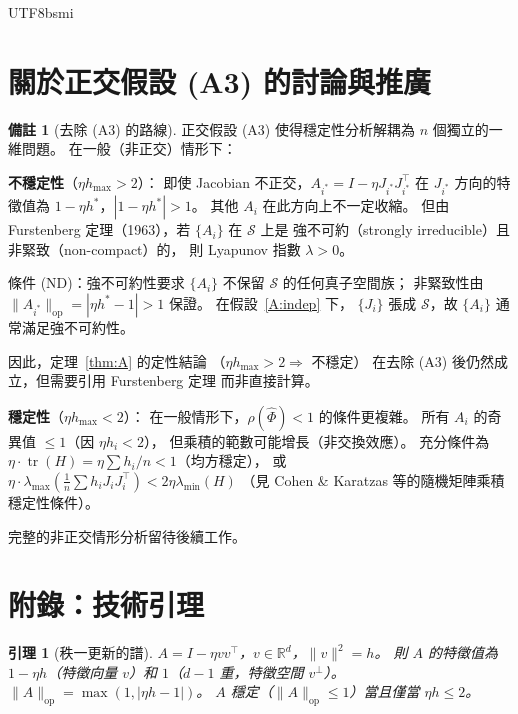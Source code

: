 \documentclass[11pt,a4paper]{article}
\newtheorem{lemma}[theorem]{引理}
\theoremstyle{definition}
\newtheorem{remark}[theorem]{備註}
\DeclareMathOperator{\tr}{tr}
\newcommand{\R}{\mathbb{R}}
\newcommand{\cS}{\mathcal{S}}
\begin{document}
\begin{CJK}{UTF8}{bsmi}
\section{關於正交假設 (A3) 的討論與推廣}

\begin{remark}[去除 (A3) 的路線]
  正交假設 (A3) 使得穩定性分析解耦為 $n$ 個獨立的一維問題。
  在一般（非正交）情形下：

  \textbf{不穩定性}（$\eta h_{\max}>2$）：
  即使 Jacobian 不正交，$A_{i^*}=I-\eta J_{i^*}J_{i^*}^\top$ 在 $J_{i^*}$
  方向的特徵值為 $1-\eta h^*$，$|1-\eta h^*|>1$。
  其他 $A_i$ 在此方向上不一定收縮。
  但由 Furstenberg 定理（1963），若 $\{A_i\}$ 在 $\cS$ 上是
  強不可約（strongly irreducible）且非緊致（non-compact）的，
  則 Lyapunov 指數 $\lambda>0$。

  條件 (ND)：強不可約性要求 $\{A_i\}$ 不保留 $\cS$ 的任何真子空間族；
  非緊致性由 $\|A_{i^*}\|_{\mathrm{op}}=|\eta h^*-1|>1$ 保證。
  在假設~\ref{A:indep} 下，
  $\{J_i\}$ 張成 $\cS$，故 $\{A_i\}$ 通常滿足強不可約性。

  因此，定理~\ref{thm:A} 的定性結論
  （$\eta h_{\max}>2 \Rightarrow$ 不穩定）
  在去除 (A3) 後仍然成立，但需要引用 Furstenberg 定理
  而非直接計算。

  \textbf{穩定性}（$\eta h_{\max}<2$）：
  在一般情形下，$\rho(\hat\Phi)<1$ 的條件更複雜。
  所有 $A_i$ 的奇異值 $\leq 1$（因 $\eta h_i<2$），
  但乘積的範數可能增長（非交換效應）。
  充分條件為 $\eta\cdot\tr(H)=\eta\sum h_i/n<1$（均方穩定），
  或 $\eta\cdot\lambda_{\max}(\frac{1}{n}\sum h_i J_iJ_i^\top)<2\eta\lambda_{\min}(H)$
  （見 Cohen \& Karatzas 等的隨機矩陣乘積穩定性條件）。

  完整的非正交情形分析留待後續工作。
\end{remark}

\section{附錄：技術引理}

\begin{lemma}[秩一更新的譜]\label{lem:rank1}
  $A=I-\eta vv^\top$，$v\in\R^d$，$\|v\|^2=h$。
  則 $A$ 的特徵值為 $1-\eta h$（特徵向量 $v$）和 $1$（$d-1$ 重，特徵空間 $v^\perp$）。
  $\|A\|_{\mathrm{op}}=\max(1,|\eta h-1|)$。
  $A$ 穩定（$\|A\|_{\mathrm{op}}\leq 1$）當且僅當 $\eta h\leq 2$。
\end{lemma}


\end{CJK}
\end{document}
